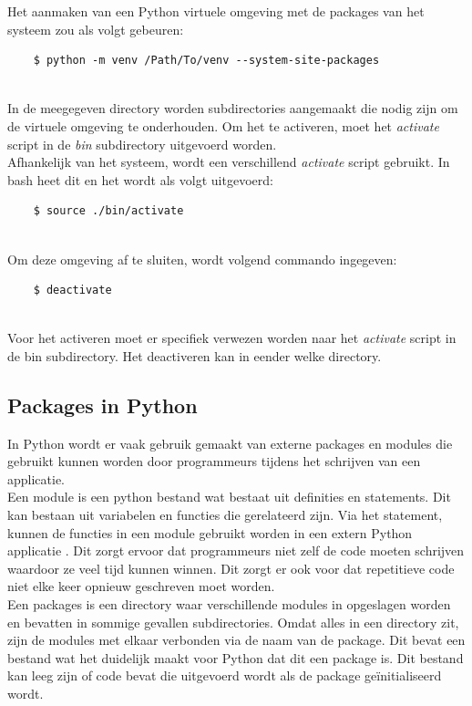 Het aanmaken van een Python virtuele omgeving met de packages van het systeem zou als volgt gebeuren:
\begin{lstlisting}
    $ python -m venv /Path/To/venv --system-site-packages
    
\end{lstlisting}

In de meegegeven directory worden subdirectories aangemaakt die nodig zijn om de virtuele omgeving te onderhouden. Om het te activeren, moet het \textit{activate} script in de \textit{bin} subdirectory uitgevoerd worden. \autocite{PSF2024} \\
Afhankelijk van het systeem, wordt een verschillend \textit{activate} script gebruikt. In bash heet dit  en het wordt als volgt uitgevoerd:
\begin{lstlisting}
    $ source ./bin/activate
    
\end{lstlisting}

Om deze omgeving af te sluiten, wordt volgend commando ingegeven:
\begin{lstlisting}
    $ deactivate
    
\end{lstlisting}

Voor het activeren moet er specifiek verwezen worden naar het \textit{activate} script in de bin subdirectory. Het deactiveren kan in eender welke directory.

\subsection{Packages in Python}
In Python wordt er vaak gebruik gemaakt van externe packages en modules die gebruikt kunnen worden door programmeurs tijdens het schrijven van een applicatie. \\
Een module is een python bestand wat bestaat uit definities en statements. Dit kan bestaan uit variabelen en functies die gerelateerd zijn. Via het  statement, kunnen de functies in een module gebruikt worden in een extern Python applicatie \autocite{Singh2024}. Dit zorgt ervoor dat programmeurs niet zelf de code moeten schrijven waardoor ze veel tijd kunnen winnen. Dit zorgt er ook voor dat repetitieve code niet elke keer opnieuw geschreven moet worden.\\

Een packages is een directory waar verschillende modules in opgeslagen worden en bevatten in sommige gevallen subdirectories. Omdat alles in een directory zit, zijn de modules met elkaar verbonden via de naam van de package. Dit bevat een  bestand wat het duidelijk maakt voor Python dat dit een package is. Dit bestand kan leeg zijn of code bevat die uitgevoerd wordt als de package geïnitialiseerd wordt. \autocite{Udacity2021} \\

